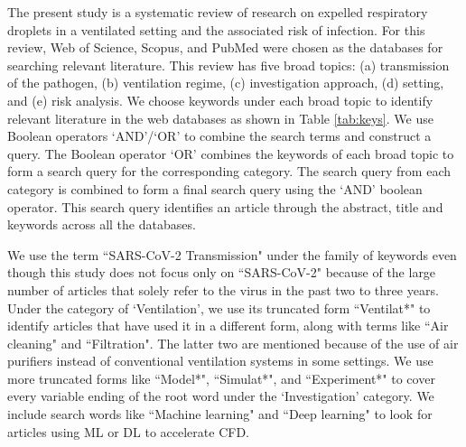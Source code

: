 \documentclass[preprint,12pt]{elsarticle}
\begin{document}
The present study is a systematic review of research on expelled respiratory droplets in a ventilated setting and the associated risk of infection. For this review, Web of Science, Scopus, and PubMed were chosen as the databases for searching relevant literature. This review has five broad topics: (a) transmission of the pathogen, (b) ventilation regime, (c) investigation approach, (d) setting, and (e) risk analysis. We choose keywords under each broad topic to identify relevant literature in the web databases as shown in Table \ref{tab:keys}. We use Boolean operators `AND'/`OR' to combine the search terms and construct a query. The Boolean operator `OR' combines the keywords of each broad topic to form a search query for the corresponding category. The search query from each category is combined to form a final search query using the `AND' boolean operator. This search query identifies an article through the abstract, title and keywords across all the databases.

We use the term ``SARS-CoV-2 Transmission" under the family of keywords even though this study does not focus only on ``SARS-CoV-2" because of the large number of articles that solely refer to the virus in the past two to three years. Under the category of `Ventilation', we use its truncated form ``Ventilat*" to identify articles that have used it in a different form, along with terms like ``Air cleaning" and ``Filtration". The latter two are mentioned because of the use of air purifiers instead of conventional ventilation systems in some settings. We use more truncated forms like ``Model*", ``Simulat*", and ``Experiment*" to cover every variable ending of the root word under the `Investigation' category. We include search words like ``Machine learning" and ``Deep learning" to look for articles using ML or DL to accelerate CFD.
\end{document}
